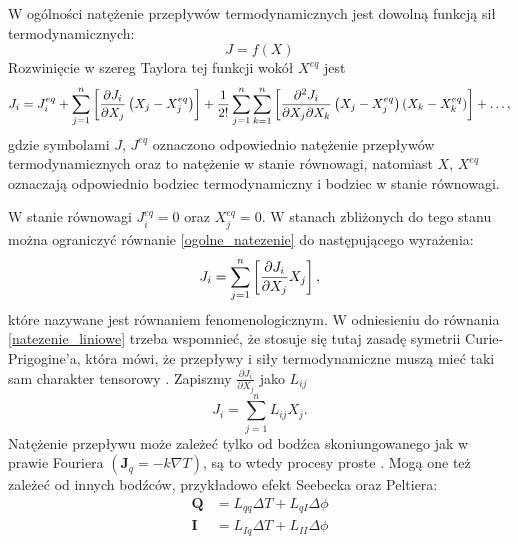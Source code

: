 \documentclass[10pt, a4paper, twoside, onecolumn]{article}
\numberwithin{equation}{section}
\begin{document}
	W ogólności natężenie przepływów termodynamicznych jest dowolną funkcją sił termodynamicznych: 
	\[J=f\left(X\right)\]
	Rozwinięcie w szereg Taylora tej funkcji wokół \(X^{eq}\) jest
	\begin{equation}\label{ogolne_natezenie}
		J_{i}=J_{i}^{eq}+\sum_{j=1}^{n}\left[\pdv{J_{i}}{X_{j}}\left(X_{j}-X_{j}^{eq}\right)\right]+\frac{1}{2!}\sum_{j=1}^{n}\sum_{k=1}^{n}\left[\pdv{J_{i}}{X_{j}}{X_{k}}\left(X_{j}-X_{j}^{eq}\right)\left(X_{k}-X_{k}^{eq}\right)\right]+\ldots,
	\end{equation}
	gdzie symbolami \(J\), \(J^{eq}\) oznaczono odpowiednio natężenie przepływów termodynamicznych oraz to natężenie w stanie równowagi, natomiast \(X\), \(X^{eq}\) oznaczają odpowiednio bodziec termodynamiczny i bodziec w stanie równowagi.
	
	W stanie równowagi \(J_{i}^{eq}=0\) oraz \(X_{j}^{eq}=0\). W stanach zbliżonych do tego stanu można ograniczyć równanie \eqref{ogolne_natezenie} do następującego wyrażenia: 
	\begin{equation}\label{natezenie_liniowe}
		J_{i}=\sum_{j=1}^{n}\left[\pdv{J_{i}}{X_{j}}X_{j}\right],
	\end{equation}
	które nazywane jest równaniem fenomenologicznym. W odniesieniu do równania \eqref{natezenie_liniowe} trzeba wspomnieć, że stosuje się tutaj zasadę symetrii Curie-Prigogine'a, która mówi, że przepływy i siły termodynamiczne muszą mieć taki sam charakter tensorowy \cite{orlik}.
	Zapiszmy \(\frac{\partial J_{i}}{\partial X_{j}}\) jako \(L_{ij}\)
	\begin{equation}
		J_{i}=\sum_{j=1}^{n}L_{ij}X_{j}.
	\end{equation}
	Natężenie przepływu może zależeć tylko od bodźca skoniungowanego jak w prawie Fouriera \(\left(\boldsymbol{J}_{q}=-k\nabla T\right)\), są to wtedy procesy proste \cite{orlik}. Mogą one też zależeć od innych bodźców, przykładowo efekt Seebecka oraz Peltiera: \cite{Ceynowa2008}
	\begin{equation}
	\begin{split}
		\boldsymbol{Q} &= L_{qq}\Delta T+L_{qI}\Delta \phi \\
		\boldsymbol{I} &= L_{Iq}\Delta T+L_{II}\Delta \phi
	\end{split}
	\end{equation}
\end{document}
